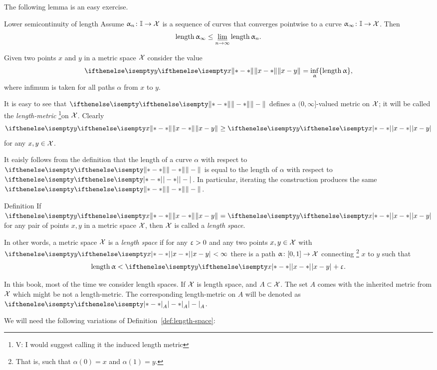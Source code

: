 The following lemma is an easy exercise.

\begin{thm}{Lower semicontinuity of length}\label{thm:semicont-of-length}
Assume $\alpha_n\:\II\to \spc{X}$ is a sequence of curves that converges pointwise to a curve $\alpha_\infty\:\II\to \spc{X}$.
Then 
\[\length\alpha_\infty\le \liminf_{n\to\infty}\length\alpha_n.\]

\end{thm}

Given two points $x$ and $y$ in a metric space $\mathcal{X}$
consider the value
\[\yetdist{x}{y}{}=\inf_{\alpha}\{\length\alpha\},\]
where infimum is taken for all paths $\alpha$ from $x$ to $y$.

It is easy to see that $\yetdist{}{}{}$ defines a $(0,\infty]$-valued metric on  $\mathcal{X}$;
it will be called the \emph{length-metric} \footnote{\red V: I would suggest calling it the induced length metric}on $\mathcal{X}$.
Clearly 
\[\yetdist{x}{y}{}\ge \dist{x}{y}{}\]
for any $x,y\in \spc{X}$.

It  eaisly follows from the definition that the length of a curve $\alpha$ with respect to $\yetdist{}{}{}$ is equal to the length of $\alpha$ with respect to $\dist{}{}{}$. In particular, iterating the construction produces the same $\yetdist{}{}{}$.

\begin{thm}{Definition}\label{def:length-space}
If $\yetdist{x}{y}{}=\dist{x}{y}{}$ for any pair of points $x,y$ in a metric space $\mathcal{X}$, then $\mathcal{X}$ is called a \emph{length space}.
\end{thm}

In other words, a metric space $\mathcal{X}$ is a
\emph{length space}
if for any $\upvarepsilon>0$ and any two points $x,y\in \spc{X}$ with $\dist{x}{y}{}<\infty$ there is a path $\alpha\:[0,1]\to\spc{X}$ connecting%
\footnote{That is, such that $\alpha(0)=x$ and $\alpha(1)=y$.}
 $x$ to $y$
such that 
\[\length\alpha<\dist{x}{y}{}+\eps.\]

In this book, most of the time we consider length spaces.
If $\mathcal{X}$ is length space, 
and $A\subset \spc{X}$.
The set $A$ comes with the inherited metric from $\mathcal{X}$ 
which might be not a length-metric.
The corresponding length-metric on $A$ will be denoted as $\dist{}{}{A}$.

We will need the following variations of Definition~\ref{def:length-space}:

